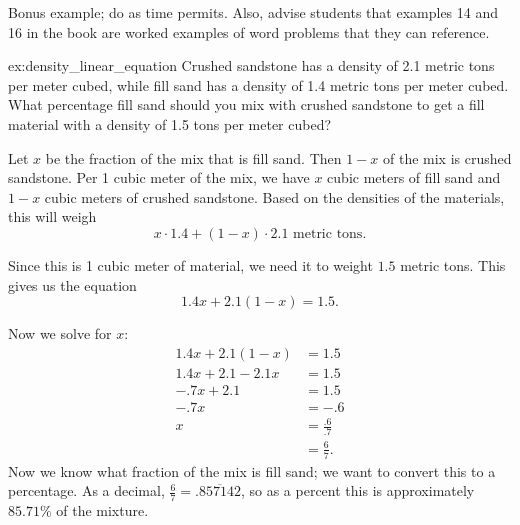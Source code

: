 \documentclass{article}
\begin{document}
\begin{directions}
    Bonus example; do as time permits. Also, advise students that examples 14 and 16 in the book are worked examples of word problems that they can reference.
\end{directions}
\begin{example}{}{ex:density_linear_equation}
    Crushed sandstone has a density of 2.1 metric tons per meter cubed, while fill sand has a density of 1.4 metric tons per meter cubed. What percentage fill sand should you mix with crushed sandstone to get a fill material with a density of 1.5 tons per meter cubed?
\end{example}
\begin{solution}
    Let $x$ be the fraction of the mix that is fill sand. Then $1-x$ of the mix is crushed sandstone. Per 1 cubic meter of the mix, we have $x$ cubic meters of fill sand and $1-x$ cubic meters of crushed sandstone. Based on the densities of the materials, this will weigh \[x\cdot 1.4 + (1-x)\cdot2.1\text{ metric tons.}\]

    Since this is 1 cubic meter of material, we need it to weight $1.5$ metric tons. This gives us the equation \[1.4x+2.1(1-x)=1.5.\]

    Now we solve for $x$:
    \begin{align*}
        1.4x+2.1(1-x)&=1.5\\
        1.4x+2.1-2.1x&=1.5\\
        -.7x+2.1&=1.5\\
        -.7x&=-.6\\
        x&=\frac{.6}{.7}\\
        &=\frac{6}{7}.
    \end{align*}
    Now we know what fraction of the mix is fill sand; we want to convert this to a percentage. As a decimal, $\frac{6}{7}=.\overline{857142}$, so as a percent this is approximately $85.71\%$ of the mixture.
\end{solution}
\end{document}
